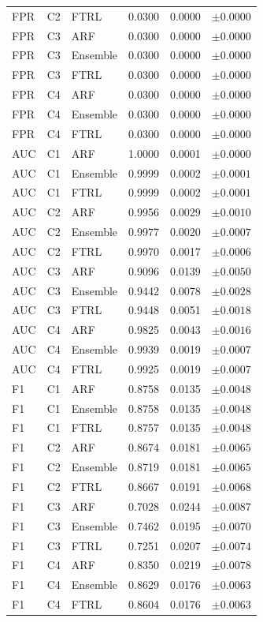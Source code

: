 \begin{table}[htbp]
\begin{tabular}{lllrrr}
FPR & C2 & FTRL & 0.0300 & 0.0000 & $\pm 0.0000$ \\
FPR & C3 & ARF & 0.0300 & 0.0000 & $\pm 0.0000$ \\
FPR & C3 & Ensemble & 0.0300 & 0.0000 & $\pm 0.0000$ \\
FPR & C3 & FTRL & 0.0300 & 0.0000 & $\pm 0.0000$ \\
FPR & C4 & ARF & 0.0300 & 0.0000 & $\pm 0.0000$ \\
FPR & C4 & Ensemble & 0.0300 & 0.0000 & $\pm 0.0000$ \\
FPR & C4 & FTRL & 0.0300 & 0.0000 & $\pm 0.0000$ \\
AUC & C1 & ARF & 1.0000 & 0.0001 & $\pm 0.0000$ \\
AUC & C1 & Ensemble & 0.9999 & 0.0002 & $\pm 0.0001$ \\
AUC & C1 & FTRL & 0.9999 & 0.0002 & $\pm 0.0001$ \\
AUC & C2 & ARF & 0.9956 & 0.0029 & $\pm 0.0010$ \\
AUC & C2 & Ensemble & 0.9977 & 0.0020 & $\pm 0.0007$ \\
AUC & C2 & FTRL & 0.9970 & 0.0017 & $\pm 0.0006$ \\
AUC & C3 & ARF & 0.9096 & 0.0139 & $\pm 0.0050$ \\
AUC & C3 & Ensemble & 0.9442 & 0.0078 & $\pm 0.0028$ \\
AUC & C3 & FTRL & 0.9448 & 0.0051 & $\pm 0.0018$ \\
AUC & C4 & ARF & 0.9825 & 0.0043 & $\pm 0.0016$ \\
AUC & C4 & Ensemble & 0.9939 & 0.0019 & $\pm 0.0007$ \\
AUC & C4 & FTRL & 0.9925 & 0.0019 & $\pm 0.0007$ \\
F1 & C1 & ARF & 0.8758 & 0.0135 & $\pm 0.0048$ \\
F1 & C1 & Ensemble & 0.8758 & 0.0135 & $\pm 0.0048$ \\
F1 & C1 & FTRL & 0.8757 & 0.0135 & $\pm 0.0048$ \\
F1 & C2 & ARF & 0.8674 & 0.0181 & $\pm 0.0065$ \\
F1 & C2 & Ensemble & 0.8719 & 0.0181 & $\pm 0.0065$ \\
F1 & C2 & FTRL & 0.8667 & 0.0191 & $\pm 0.0068$ \\
F1 & C3 & ARF & 0.7028 & 0.0244 & $\pm 0.0087$ \\
F1 & C3 & Ensemble & 0.7462 & 0.0195 & $\pm 0.0070$ \\
F1 & C3 & FTRL & 0.7251 & 0.0207 & $\pm 0.0074$ \\
F1 & C4 & ARF & 0.8350 & 0.0219 & $\pm 0.0078$ \\
F1 & C4 & Ensemble & 0.8629 & 0.0176 & $\pm 0.0063$ \\
F1 & C4 & FTRL & 0.8604 & 0.0176 & $\pm 0.0063$ \\
\bottomrule
\end{tabular}
\end{table}
